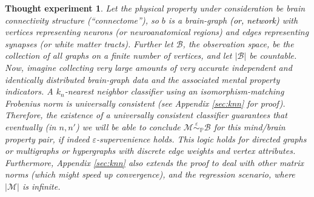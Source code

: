 \documentclass{article}
\newcommand{\mB}{\mathcal{B}}
\newcommand{\mM}{\mathcal{M}}
\newcommand{\PP}{\mathbb{P}}           %
\newcommand{\MeB}{\mM \overset{\varepsilon}{{\sim}}_{\PP} \mB}
\providecommand{\tr}[1]{\textcolor{black}{#1}}
\newtheorem{thex}{Thought experiment}
\begin{document}
\begin{thex}
Let the physical property under consideration be brain connectivity structure (``connectome''), so $b$ is a brain-graph \tr{(or, network)} with vertices representing neurons (or neuroanatomical regions) and edges representing synapses (or white matter tracts). Further let $\mB$, the observation space, be the collection of all graphs on a finite number of vertices, and let $|\mB|$ be countable. Now, imagine collecting very large amounts of very accurate independent and identically distributed brain-graph data and the associated mental property indicators. A $k_n$-nearest neighbor classifier using an isomorphism-matching Frobenius norm is universally consistent (see Appendix \ref{sec:knn} for proof). Therefore, %
the existence of a universally consistent classifier guarantees that eventually (in $n,n'$) we will be able to conclude $\MeB$ for this mind/brain property pair, if indeed $\varepsilon$-supervenience holds. This logic holds for directed graphs or multigraphs or hypergraphs with discrete edge weights and vertex attributes. Furthermore, Appendix \ref{sec:knn} also extends the proof to deal with other matrix norms (which might speed up convergence), and the regression scenario, where $|\mM|$ is infinite.  
\end{thex}
\end{document}
